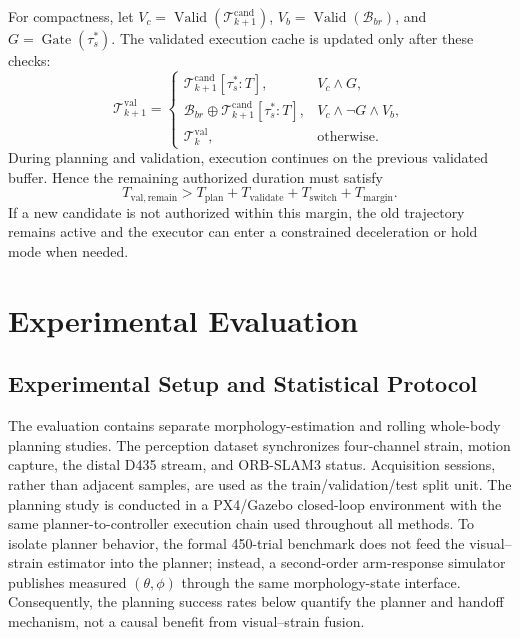 \documentclass[journal,twoside]{IEEEtran}
\begin{document}
For compactness, let $V_c=\operatorname{Valid}(\mathcal T_{k+1}^{\mathrm{cand}})$, $V_b=\operatorname{Valid}(\mathcal B_{br})$, and $G=\operatorname{Gate}(\tau_s^*)$. The validated execution cache is updated only after these checks:
\begin{equation}
\mathcal T_{k+1}^{\mathrm{val}}=
\begin{cases}
\mathcal T_{k+1}^{\mathrm{cand}}[\tau_s^*:T],&V_c\land G,\\
\mathcal B_{br}\oplus\mathcal T_{k+1}^{\mathrm{cand}}[\tau_s^*:T],
&V_c\land\neg G\land V_b,\\
\mathcal T_k^{\mathrm{val}},&\text{otherwise}.
\end{cases}
\label{eq:validated_cache}
\end{equation}
During planning and validation, execution continues on the previous validated buffer. Hence the remaining authorized duration must satisfy
\begin{equation}
T_{\mathrm{val,remain}}>
T_{\mathrm{plan}}+T_{\mathrm{validate}}+T_{\mathrm{switch}}+T_{\mathrm{margin}}.
\label{eq:buffer_margin}
\end{equation}
If a new candidate is not authorized within this margin, the old trajectory remains active and the executor can enter a constrained deceleration or hold mode when needed.

\section{Experimental Evaluation}
\subsection{Experimental Setup and Statistical Protocol}
The evaluation contains separate morphology-estimation and rolling whole-body planning studies. The perception dataset synchronizes four-channel strain, motion capture, the distal D435 stream, and ORB-SLAM3 status. Acquisition sessions, rather than adjacent samples, are used as the train/validation/test split unit. The planning study is conducted in a PX4/Gazebo closed-loop environment with the same planner-to-controller execution chain used throughout all methods. To isolate planner behavior, the formal 450-trial benchmark does not feed the visual--strain estimator into the planner; instead, a second-order arm-response simulator publishes measured $(\theta,\phi)$ through the same morphology-state interface. Consequently, the planning success rates below quantify the planner and handoff mechanism, not a causal benefit from visual--strain fusion.
\end{document}
